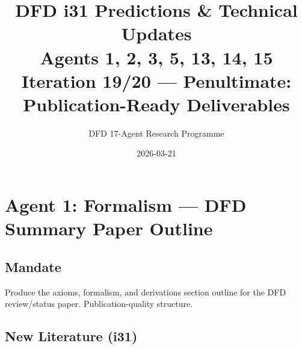 \documentclass[11pt,a4paper]{article}
\title{DFD i31 Predictions \& Technical Updates\\Agents 1, 2, 3, 5, 13, 14, 15\\[6pt]\large Iteration 19/20 --- Penultimate: Publication-Ready Deliverables}
\author{DFD 17-Agent Research Programme}
\date{2026-03-21}
\begin{document}
\maketitle
\tableofcontents
\newpage

\section{Agent 1: Formalism --- DFD Summary Paper Outline}

\subsection{Mandate}
Produce the axioms, formalism, and derivations section outline for the DFD review/status paper. Publication-quality structure.

\subsection{New Literature (i31)}
\end{document}
